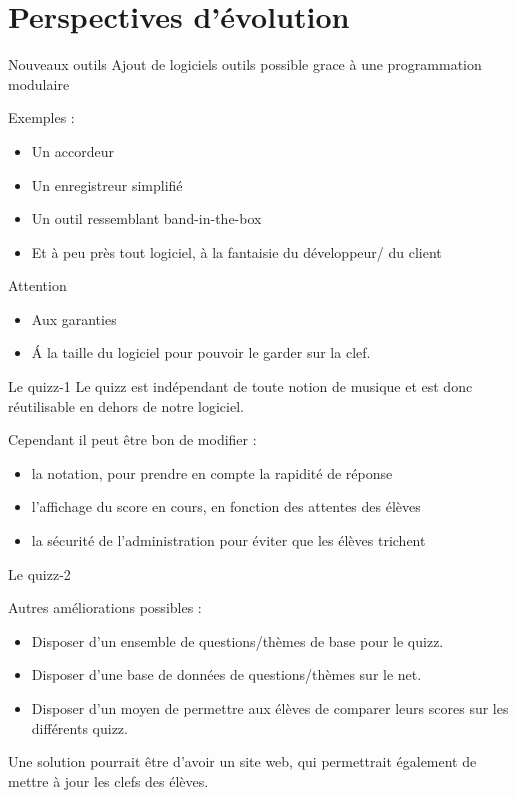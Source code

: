 \section{Perspectives d'évolution}

\begin{frame}
  \tableofcontents[currentsection]
\end{frame}
\begin{frame}{Nouveaux outils}
  Ajout de logiciels outils possible grace à une programmation modulaire
\begin{block}{Exemples : }
  \begin{itemize}
  \item Un accordeur
  \item Un enregistreur simplifié
  \item Un outil ressemblant band-in-the-box
  \item Et à peu près tout logiciel, à la fantaisie du développeur/ du client
  \end{itemize}
\end{block}
\begin{alertblock}{Attention}
  \begin{itemize}
  \item Aux garanties
  \item \'A la taille du logiciel pour pouvoir le garder sur la clef.
  \end{itemize}
\end{alertblock}
\end{frame}

\begin{frame}{Le quizz-1}
Le quizz est indépendant de toute notion de musique et est donc réutilisable en dehors de notre logiciel.\\
\begin{block}{Cependant il peut être bon de modifier :}
  \begin{itemize}
  \item la notation, pour prendre en compte la rapidité de réponse
  \item l'affichage du score en cours, en fonction des attentes des élèves
  \item la sécurité de l'administration pour éviter que les élèves trichent
  \end{itemize}
\end{block}
\end{frame}
\begin{frame}{Le quizz-2}
\begin{block}{Autres améliorations possibles : }
  \begin{itemize}
  \item Disposer d'un ensemble de questions/thèmes de base pour le quizz.
  \item Disposer d'une base de données de questions/thèmes sur le net.
  \item Disposer d'un moyen de permettre aux élèves de comparer leurs scores sur les différents quizz.
  \end{itemize}  
  Une solution pourrait être d'avoir un site web, qui permettrait également de mettre à jour les clefs des élèves.
\end{block}
\end{frame}

